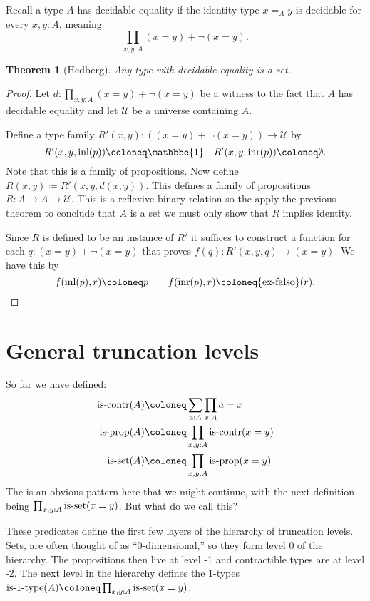 \documentclass{amsart}
\theoremstyle{theorem}
\newtheorem*{thm}{Theorem}
\theoremstyle{definition}
\theoremstyle{remark}
\newcommand{\0}{\mathbbe{0}}
\newcommand{\1}{\mathbbe{1}}
\newcommand{\2}{\mathbbe{2}}
\newcommand{\3}{\mathbbe{3}}
\newcommand{\4}{\mathbbe{4}}
\newcommand{\term}[1]{{\textup{#1}}}
\newcommand{\type}[1]{{\textup{#1}}}
\newcommand{\inl}{\term{inl}}
\newcommand{\inr}{\term{inr}}
\newcommand{\UU}{{\mathcal{U}}}
\newcommand{\is}[1]{\type{is-{#1}}}
\newcommand{\iscontr}{\type{is-contr}}
\newcommand{\isprop}{\type{is-prop}}
\begin{document}
Recall a type $A$ has decidable equality  if the identity type $x=_Ay$ is decidable for every $x, y : A$, meaning
\[ \prod_{x,y:A} (x=y) + \neg (x=y).\]

\begin{thm}[Hedberg] Any type with decidable equality is a set.
\end{thm}
\begin{proof} Let $d : \prod_{x,y:A} (x=y) + \neg (x=y)$ be a witness to the fact that $A$ has decidable equality and let $\UU$ be a universe containing $A$.

Define a type family $R'(x,y) : ((x=y) +\neg(x=y)) \to \UU$ by
\[ R'(x,y, \inl(p)) \coloneq \1 \quad R'(x,y, \inr(p)) \coloneq \emptyset.\]
Note that this is a family of propositions. Now define $R(x,y) \coloneq R'(x,y,d(x,y))$. This defines a family of propositions $R : A \to A \to \UU$. This is a reflexive binary relation so the apply the previous theorem to conclude that $A$ is a set we must only show that $R$ implies identity.

Since $R$ is defined to be an instance of $R'$ it suffices to construct a function for each $q : (x=y) + \neg(x=y)$ that proves $f(q) : R'(x,y,q) \to (x=y)$. We have this by
\[ f(\inl(p),r) \coloneq p \qquad f(\inr(p),r) \coloneq \term{ex-falso}(r). \qedhere\]
\end{proof}

\section*{General truncation levels}

So far we have defined:
\begin{align*}
\iscontr(A) &\coloneq \sum_{a:A} \prod_{x:A} a=x\\
\isprop(A) &\coloneq \prod_{x,y:A} \iscontr(x=y) \\
\is{set}(A) &\coloneq \prod_{x,y:A} \isprop(x=y)
\end{align*}
The is an obvious pattern here that we might continue, with the next definition being $\prod_{x,y:A} \is{set}(x=y)$. But what do we call this?

These predicates define the first few layers of the hierarchy of truncation levels. Sets, are often thought of as ``0-dimensional,'' so they form level 0 of the hierarchy. The propositions then live at level -1 and contractible types are at level -2. The next level in the hierarchy defines the 1-types $\is{1-type}(A) \coloneq\prod_{x,y:A} \is{set}(x=y)$.
\end{document}
